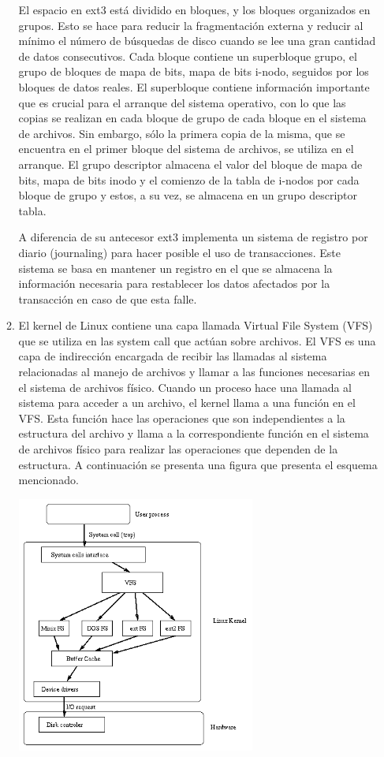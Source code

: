 \documentclass[a4paper,11pt] {article}
\begin{document}
\begin{enumerate}
\begin{enumerate}
			El espacio en ext3 está dividido en bloques, y los bloques organizados en grupos. Esto se hace para reducir la fragmentación externa y reducir al mínimo el número de búsquedas de disco cuando se lee una gran cantidad de datos consecutivos.
			Cada bloque contiene un superbloque grupo, el grupo de bloques de mapa de bits, mapa de bits i-nodo, seguidos por los bloques de datos reales.
			El superbloque contiene información importante que es crucial para el arranque del sistema operativo, con lo que las copias se realizan en cada bloque de grupo de cada bloque en el sistema de archivos. Sin embargo, sólo la primera copia de la misma, que se encuentra en el primer bloque del sistema de archivos, se utiliza en el arranque.
			El grupo descriptor almacena el valor del bloque de mapa de bits, mapa de bits inodo y el comienzo de la tabla de i-nodos por cada bloque de grupo y estos, a su vez, se almacena en un grupo descriptor tabla.
	
			A diferencia de su antecesor ext3 implementa un sistema de registro por diario (journaling) para hacer posible el uso de transacciones. Este sistema se basa en mantener un registro en el que se almacena la información necesaria para restablecer los datos afectados por la transacción en caso de que esta falle.

			\item El kernel de Linux contiene una capa llamada Virtual File System (VFS) que se utiliza en las system call que actúan sobre archivos. El VFS es una capa de indirección encargada de recibir las llamadas al sistema relacionadas al manejo de archivos y llamar a las funciones necesarias en el sistema de archivos físico. 
			Cuando un proceso hace una llamada al sistema para acceder a un archivo, el kernel llama a una función en el VFS. Esta función hace las operaciones que son independientes a la estructura del archivo y llama a la correspondiente función en el sistema de archivos físico para realizar las operaciones que dependen de la estructura. A continuación se presenta una figura que presenta el esquema mencionado.
			\begin{center}
			\includegraphics[width=0.65\textwidth]{ext2-vfs.png}
			\end{center}


\end{enumerate}
\end{enumerate}
\end{document}
